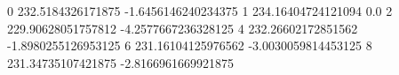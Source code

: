 0 232.5184326171875 -1.6456146240234375
1 234.16404724121094 0.0
2 229.90628051757812 -4.2577667236328125
4 232.26602172851562 -1.8980255126953125
6 231.16104125976562 -3.0030059814453125
8 231.34735107421875 -2.8166961669921875
